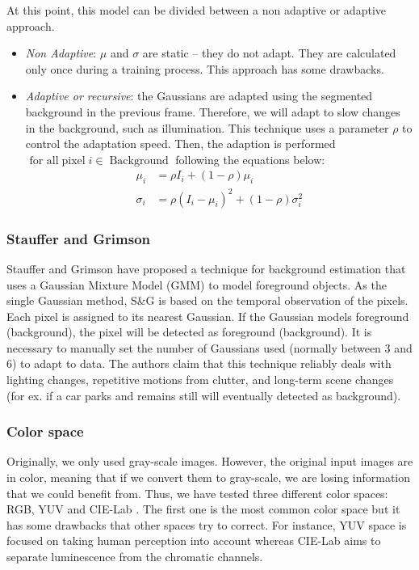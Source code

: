 \documentclass{article}
\begin{document}
At this point, this model can be divided between a non adaptive or adaptive approach.

\begin{itemize}
	\item \emph{Non Adaptive}: \(\mu\) and \(\sigma\) are static -- they do not adapt. They are calculated only once during a training process. This approach has some drawbacks.
	\item \emph{Adaptive or recursive}: the Gaussians are adapted using the segmented background in the previous frame. Therefore, we will adapt to slow changes in the background, such as illumination. This technique uses a parameter \(\rho\) to control the adaptation speed. Then, the adaption is performed\(\mbox{ for all} \operatorname{pixel} i \in \operatorname{Background}\) following the equations below:
    \begin{equation}
      \begin{aligned}
            \mu_i &= \rho I_i+ (1-\rho)\mu_i\\
            \sigma_i &= \rho(I_i-\mu_i)^2+(1-\rho)\sigma_i^2
      \end{aligned}
    \end{equation}
\end{itemize}

\subsubsection{Stauffer and Grimson}
\label{subsec:st_gr}
Stauffer and Grimson \cite{stauffer1999} have proposed a technique for background estimation that uses a Gaussian Mixture Model (GMM) to model foreground objects. As the single Gaussian method, S\&G is based on the temporal observation of the pixels. 
Each pixel is assigned to its nearest Gaussian. If the Gaussian models foreground (background), the pixel will be detected as foreground (background). It is necessary to manually set the number of Gaussians used (normally between 3 and 6) to adapt to data. 
The authors claim that this technique reliably deals with lighting changes, repetitive motions from clutter, and long-term scene changes (for ex. if a car parks and remains still will eventually detected as background).

\subsubsection{Color space}
\label{subsec:color}

Originally, we only used gray-scale images. However, the original input images are in color, meaning that if we convert them to gray-scale, we are losing information that we could benefit from. Thus, we have tested three different color spaces: RGB, YUV and CIE-Lab \cite{hunter1948}. The first one is the most common color space but it has some drawbacks that other spaces try to correct. For instance, YUV space is focused on taking human perception into account whereas CIE-Lab aims to separate luminescence from the chromatic channels.
\end{document}

